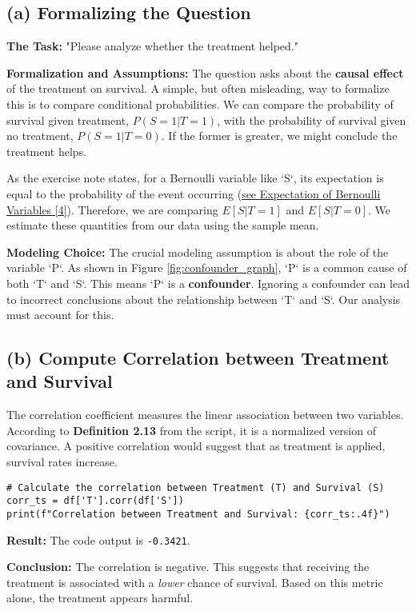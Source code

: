 \documentclass[11pt,a4paper]{article}
\begin{document}
\subsection{(a) Formalizing the Question}
\textbf{The Task:} "Please analyze whether the treatment helped."

\textbf{Formalization and Assumptions:}
The question asks about the \textbf{causal effect} of the treatment on survival. A simple, but often misleading, way to formalize this is to compare conditional probabilities. We can compare the probability of survival given treatment, $P(S=1 | T=1)$, with the probability of survival given no treatment, $P(S=1 | T=0)$. If the former is greater, we might conclude the treatment helps.

As the exercise note states, for a Bernoulli variable like `S`, its expectation is equal to the probability of the event occurring (\hyperref[sec:exp_bern]{see Expectation of Bernoulli Variables [4]}). Therefore, we are comparing $E[S | T=1]$ and $E[S | T=0]$. We estimate these quantities from our data using the sample mean.

\textbf{Modeling Choice:} The crucial modeling assumption is about the role of the variable `P`. As shown in Figure \ref{fig:confounder_graph}, `P` is a common cause of both `T` and `S`. This means `P` is a \textbf{confounder}. Ignoring a confounder can lead to incorrect conclusions about the relationship between `T` and `S`. Our analysis must account for this.

\subsection{(b) Compute Correlation between Treatment and Survival}
The correlation coefficient measures the linear association between two variables. According to \textbf{Definition 2.13} from the script, it is a normalized version of covariance. A positive correlation would suggest that as treatment is applied, survival rates increase.

\begin{lstlisting}
# Calculate the correlation between Treatment (T) and Survival (S)
corr_ts = df['T'].corr(df['S'])
print(f"Correlation between Treatment and Survival: {corr_ts:.4f}")
\end{lstlisting}
\textbf{Result:} The code output is \texttt{-0.3421}.

\textbf{Conclusion:} The correlation is negative. This suggests that receiving the treatment is associated with a \textit{lower} chance of survival. Based on this metric alone, the treatment appears harmful.
\end{document}

